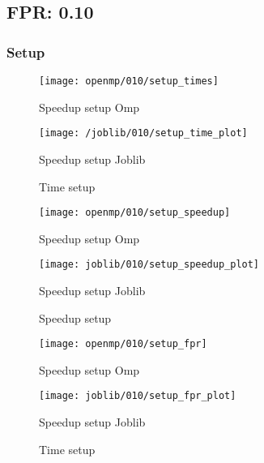 \subsection{FPR: 0.10}\label{subsec:fpr-010}
\subsubsection{Setup}\label{subsubsec:fpr-010-setup}
\begin{figure}[H]
    \centering
    \texttt{[image: openmp/010/setup\_times]}
        \caption{Speedup setup Omp}\label{fig:010-setup_time_omp}
    \endminipage\hfill
    \texttt{[image: /joblib/010/setup\_time\_plot]}
        \caption{Speedup setup Joblib}\label{fig:010setup_time_joblib}
    \endminipage\hfill
    \caption{Time setup}
\end{figure}
\begin{figure}[H]
    \centering
    \texttt{[image: openmp/010/setup\_speedup]}
        \caption{Speedup setup Omp}\label{fig:010-setup_speedup_omp}
    \endminipage\hfill
    \texttt{[image: joblib/010/setup\_speedup\_plot]}
        \caption{Speedup setup Joblib}\label{fig:010-setup_speedup_joblib}
    \endminipage\hfill
    \caption{Speedup setup}
\end{figure}
\begin{figure}[H]
    \centering
    \texttt{[image: openmp/010/setup\_fpr]}
        \caption{Speedup setup Omp}\label{fig:010-setup_fpr_omp}
    \endminipage\hfill
    \texttt{[image: joblib/010/setup\_fpr\_plot]}
        \caption{Speedup setup Joblib}\label{fig:010-setup_fpr_joblib}
    \endminipage\hfill
    \caption{Time setup}
\end{figure}


